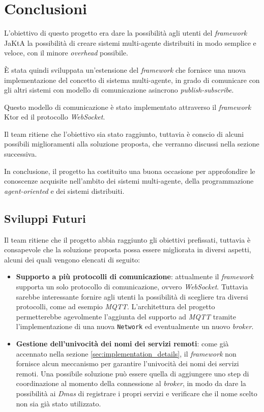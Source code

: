 \section{Conclusioni}
L'obiettivo di questo progetto era dare la possibilità agli utenti del \textit{framework} JaKtA la possibilità di creare sistemi multi-agente distribuiti in modo semplice e veloce, con il minore \textit{overhead} possibile.

È stata quindi sviluppata un'estensione del \textit{framework} che fornisce una nuova implementazione del concetto di sistema multi-agente, in grado di comunicare con gli altri sistemi con modello di comunicazione asincrono \textit{publish-subscribe}.

Questo modello di comunicazione è stato implementato attraverso il \textit{framework} Ktor ed il protocollo \textit{WebSocket}.

Il team ritiene che l'obiettivo sia stato raggiunto, tuttavia è conscio di alcuni possibili miglioramenti alla soluzione proposta, che verranno discussi nella sezione successiva.

In conclusione, il progetto ha costituito una buona occasione per approfondire le conoscenze acquisite nell'ambito dei sistemi multi-agente, della programmazione \textit{agent-oriented} e dei sistemi distribuiti.


\subsection{Sviluppi Futuri}
Il team ritiene che il progetto abbia raggiunto gli obiettivi prefissati, tuttavia è consapevole che la soluzione proposta possa essere migliorata in diversi aspetti, alcuni dei quali vengono elencati di seguito:

\begin{itemize}
    \item \textbf{Supporto a più protocolli di comunicazione}: attualmente il \textit{framework} supporta un solo protocollo di comunicazione, ovvero \textit{WebSocket}. Tuttavia sarebbe interessante
    fornire agli utenti la possibilità di scegliere tra diversi protocolli, come ad esempio \textit{MQTT}. L'architettura del progetto permetterebbe agevolmente l'aggiunta del supporto ad \textit{MQTT}
    tramite l'implementazione di una nuova \texttt{Network} ed eventualmente un nuovo \textit{broker}.
    \item \textbf{Gestione dell'univocità dei nomi dei servizi remoti}: come già accennato nella sezione \ref{sec:implementation_details}, il \textit{framework} non fornisce alcun meccanismo per garantire
    l'univocità dei nomi dei servizi remoti. Una possibile soluzione può essere quella di aggiungere uno step di coordinazione al momento della connessione al \textit{broker}, in modo da dare la possibilità ai
    \textit{Dmas} di registrare i propri servizi e verificare che il nome scelto non sia già stato utilizzato.
\end{itemize}
